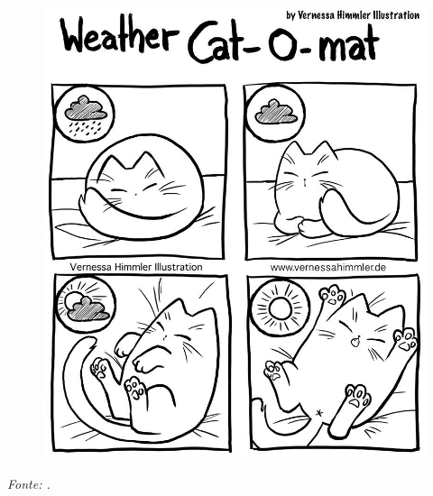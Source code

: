 \begin{epigrafe}
	\vspace*{\fill}
	\begin{flushright}
		\begin{figure}[hb]
			\includegraphics[width=0.5\columnwidth,right]{figs/cat_meme.jpg}
		\end{figure}
		\textit{Fonte: .}
	\end{flushright}
\end{epigrafe}
